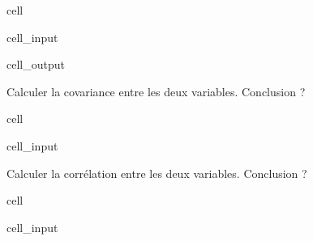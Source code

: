 \documentclass[letterpaper,10pt,french]{sphinxmanual}
\begin{document}
\begin{sphinxuseclass}{cell}
\begin{sphinxuseclass}{cell_input}
\begin{sphinxVerbatim}[commandchars=\\\{\}]
\PYG{p}{[}\PYG{p}{]}
  
\PYG{p}{[}\PYG{p}{[}\PYG{p}{]} \PYG{p}{[}\PYG{p}{]}  \PYG{p}{]}
\end{sphinxVerbatim}

\end{sphinxuseclass}
\begin{sphinxuseclass}{cell_output}
\noindent{}

\end{sphinxuseclass}
\end{sphinxuseclass}
\sphinxAtStartPar
Calculer la covariance entre les deux variables. Conclusion ?

\begin{sphinxuseclass}{cell}
\begin{sphinxuseclass}{cell_input}
\begin{sphinxVerbatim}[commandchars=\\\{\}]
\end{sphinxVerbatim}

\end{sphinxuseclass}
\end{sphinxuseclass}
\sphinxAtStartPar
Calculer la corrélation entre les deux variables. Conclusion ?

\begin{sphinxuseclass}{cell}
\begin{sphinxuseclass}{cell_input}
\begin{sphinxVerbatim}[commandchars=\\\{\}]
\end{sphinxVerbatim}

\end{sphinxuseclass}
\end{sphinxuseclass}
\end{document}

